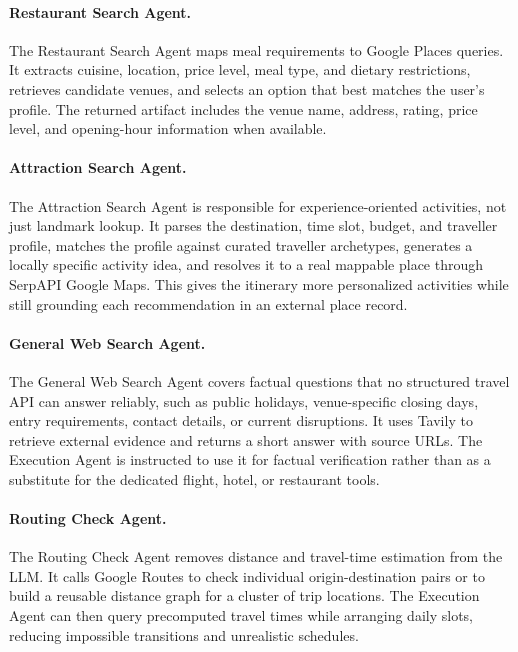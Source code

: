 \documentclass[a4paper,oneside,bibliography=totoc]{scrbook}
\begin{document}
\paragraph{Restaurant Search Agent.}
The Restaurant Search Agent maps meal requirements to Google Places queries. It
extracts cuisine, location, price level, meal type, and dietary restrictions,
retrieves candidate venues, and selects an option that best matches the user's
profile. The returned artifact includes the venue name, address, rating, price
level, and opening-hour information when available.

\paragraph{Attraction Search Agent.}
The Attraction Search Agent is responsible for experience-oriented activities,
not just landmark lookup. It parses the destination, time slot, budget, and
traveller profile, matches the profile against curated traveller archetypes,
generates a locally specific activity idea, and resolves it to a real mappable
place through SerpAPI Google Maps. This gives the itinerary more personalized
activities while still grounding each recommendation in an external place
record.

\paragraph{General Web Search Agent.}
The General Web Search Agent covers factual questions that no structured travel
API can answer reliably, such as public holidays, venue-specific closing days,
entry requirements, contact details, or current disruptions. It uses Tavily to
retrieve external evidence and returns a short answer with source URLs. The
Execution Agent is instructed to use it for factual verification rather than as
a substitute for the dedicated flight, hotel, or restaurant tools.

\paragraph{Routing Check Agent.}
The Routing Check Agent removes distance and travel-time estimation from the
LLM. It calls Google Routes to check individual origin-destination pairs or to
build a reusable distance graph for a cluster of trip locations. The Execution
Agent can then query precomputed travel times while arranging daily slots,
reducing impossible transitions and unrealistic schedules.
\end{document}
